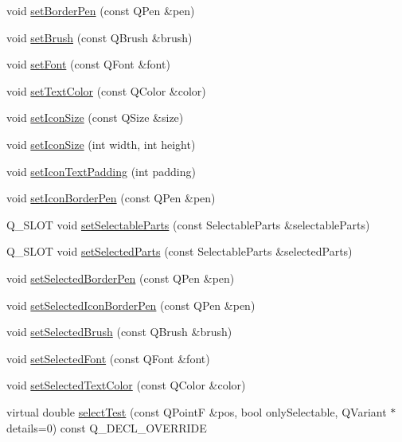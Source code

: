 \begin{DoxyCompactItemize}
\item 
void \hyperlink{class_q_c_p_legend_a866a9e3f5267de7430a6c7f26a61db9f}{set\+Border\+Pen} (const Q\+Pen \&pen)
\item 
void \hyperlink{class_q_c_p_legend_a497bbcd38baa3598c08e2b3f48103f23}{set\+Brush} (const Q\+Brush \&brush)
\item 
void \hyperlink{class_q_c_p_legend_aa4cda8499e3cb0f3be415edc02984c73}{set\+Font} (const Q\+Font \&font)
\item 
void \hyperlink{class_q_c_p_legend_ae1eb239ff4a4632fe1b6c3e668d845c6}{set\+Text\+Color} (const Q\+Color \&color)
\item 
void \hyperlink{class_q_c_p_legend_a8b0740cce488bf7010da6beda6898984}{set\+Icon\+Size} (const Q\+Size \&size)
\item 
void \hyperlink{class_q_c_p_legend_a96b1a37fd4ee6a9778e6e54fe56ab6c2}{set\+Icon\+Size} (int width, int height)
\item 
void \hyperlink{class_q_c_p_legend_a62973bd69d5155e8ea3141366e8968f6}{set\+Icon\+Text\+Padding} (int padding)
\item 
void \hyperlink{class_q_c_p_legend_a2f2c93d18a651f4ff294bb3f026f49b8}{set\+Icon\+Border\+Pen} (const Q\+Pen \&pen)
\item 
Q\+\_\+\+S\+L\+OT void \hyperlink{class_q_c_p_legend_a9ce60aa8bbd89f62ae4fa83ac6c60110}{set\+Selectable\+Parts} (const Selectable\+Parts \&selectable\+Parts)
\item 
Q\+\_\+\+S\+L\+OT void \hyperlink{class_q_c_p_legend_a2aee309bb5c2a794b1987f3fc97f8ad8}{set\+Selected\+Parts} (const Selectable\+Parts \&selected\+Parts)
\item 
void \hyperlink{class_q_c_p_legend_a2c35d262953a25d96b6112653fbefc88}{set\+Selected\+Border\+Pen} (const Q\+Pen \&pen)
\item 
void \hyperlink{class_q_c_p_legend_ade93aabe9bcccaf9cf46cec22c658027}{set\+Selected\+Icon\+Border\+Pen} (const Q\+Pen \&pen)
\item 
void \hyperlink{class_q_c_p_legend_a875227f3219c9799464631dec5e8f1bd}{set\+Selected\+Brush} (const Q\+Brush \&brush)
\item 
void \hyperlink{class_q_c_p_legend_ab580a01c3c0a239374ed66c29edf5ad2}{set\+Selected\+Font} (const Q\+Font \&font)
\item 
void \hyperlink{class_q_c_p_legend_a7674dfc7a1f30e1abd1018c0ed45e0bc}{set\+Selected\+Text\+Color} (const Q\+Color \&color)
\item 
virtual double \hyperlink{class_q_c_p_legend_aa53507624491908fb3d1a514b1fc674e}{select\+Test} (const Q\+PointF \&pos, bool only\+Selectable, Q\+Variant $\ast$details=0) const Q\+\_\+\+D\+E\+C\+L\+\_\+\+O\+V\+E\+R\+R\+I\+DE

\end{DoxyCompactItemize}

